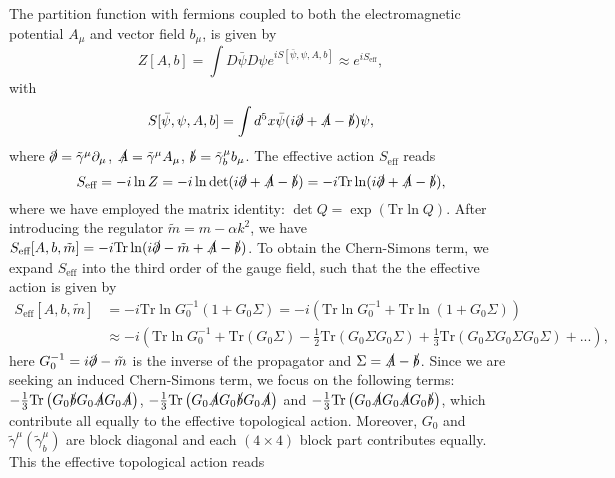 \documentclass[twocolumn,prl,10pt,superscriptaddress]{revtex4}
\begin{document}
\begin{appendix}
The partition function with fermions coupled to both the electromagnetic potential $A_\mu$ and vector field $b_\mu$, is given by  \cite{Redlich1984}
\begin{equation}
Z[A,b]=\int D\bar{\psi}D\psi e^{iS[\bar{\psi},\psi,A,b]}\approx e^{iS_{\text{eff}}},
\end{equation}
with
\begin{equation}
S[\bar{\psi},\psi,A,b]=\int d^5x \bar{\psi}(i\slashed{\partial}+\slashed{A}-\slashed{b})\psi,
\end{equation}
where $\slashed{\partial}=\tilde{\gamma}^{\mu}\partial_{\mu}$, $\slashed{A}=\tilde{\gamma}^{\mu}A_{\mu}$, $\slashed{b}=\tilde{\gamma}^{\mu}_bb_{\mu}$.
The effective action $S_{\text{eff}}$ reads
\begin{equation}
S_{\text{eff}}=-i\ln Z=-i \ln \det(i\slashed{\partial}+\slashed{A}-\slashed{b})=-i\text{Tr} \ln(i\slashed{\partial}+\slashed{A}-\slashed{b}),
\end{equation}
where we have employed the matrix identity: $\det Q=\exp (\text{Tr} \ln Q)$. After introducing the regulator $\tilde{m}=m-\alpha k^2$, we have $S_{\text{eff}}[A,b,\tilde{m}]=-i\text{Tr} \ln(i\slashed{\partial}-\tilde{m}+\slashed{A}-\slashed{b})$. To obtain the Chern-Simons term, we expand $S_{\text{eff}}$ into the third order of the gauge field, such that the the effective action is given by
\begin{equation}
\begin{aligned}
S_{\text{eff}}[A,b,\tilde{m}]&=-i\text{Tr} \ln G_0^{-1}(1+G_0\Sigma)=-i\left(\text{Tr} \ln G_0^{-1} +\text{Tr} \ln (1+G_0\Sigma)\right)\\
&\approx -i\left(\text{Tr} \ln G_0^{-1}+\text{Tr}  (G_0\Sigma)-\frac{1}{2}\text{Tr} (G_0\Sigma G_0\Sigma)+\frac{1}{3} \text{Tr} (G_0\Sigma G_0\Sigma G_0\Sigma)+...\right),
\end{aligned}
\end{equation}
here $G_0^{-1}=i\slashed{\partial}-\tilde{m}$ is the inverse of the propagator and $\Sigma=\slashed{A}-\slashed{b}$.  Since we are seeking an induced Chern-Simons term, we focus on the following terms: $-\frac{1}{3}\text{Tr}\left(G_0\slashed{b}G_0\slashed{A}G_0\slashed{A}\right)$, $-\frac{1}{3}\text{Tr}\left(G_0\slashed{A}G_0\slashed{b}G_0\slashed{A}\right)$ and $-\frac{1}{3}\text{Tr}\left(G_0\slashed{A}G_0\slashed{A}G_0\slashed{b}\right)$, which contribute all equally to the effective topological action.  Moreover, $G_0$ and $\tilde{\gamma}^{\mu}(\tilde{\gamma}^{\mu}_b)$ are block diagonal and each $(4\times4)$ block part contributes equally. This the effective topological action reads

\end{appendix}
\end{document}
